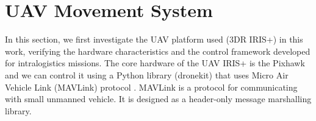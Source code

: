 \documentclass[conference,harvard,brazil,english]{sbatex}
\newcommand{\R}{\mathbb R}
\begin{document}
%

\section{UAV Movement System}
\label{sec:uav}


In this section, we first investigate the UAV platform used (3DR IRIS+) in this work, verifying the hardware characteristics and the control framework developed for intralogistics missions. The core hardware of the UAV IRIS+ is the Pixhawk and we can control it using a Python library (dronekit) that uses Micro Air Vehicle Link (MAVLink) protocol \cite{meier2011pixhawk}. MAVLink is a protocol for communicating with small unmanned vehicle. It is designed as a header-only message marshalling library. 
\end{document}
